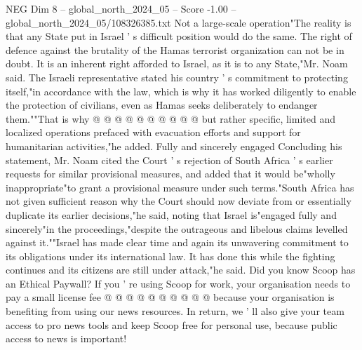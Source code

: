 \begin{textsample}{NEG Dim 8 – global\_north\_2024\_05 – Score -1.00 – global\_north\_2024\_05/108326385.txt}
Not a large-scale operation"The reality is that any State put in Israel ' s difficult position would do the same.
The right of defence against the brutality of the Hamas terrorist organization can not be in doubt.
It is an inherent right afforded to Israel, as it is to any State,"Mr.
Noam said.
The Israeli representative stated his country ' s commitment to protecting itself,"in accordance with the law, which is why it has worked diligently to enable the protection of civilians, even as Hamas seeks deliberately to endanger them.""That is why @ @ @ @ @ @ @ @ @ @ but rather specific, limited and localized operations prefaced with evacuation efforts and support for humanitarian activities,"he added.
Fully and sincerely engaged Concluding his statement, Mr.
Noam cited the Court ' s rejection of South Africa ' s earlier requests for similar provisional measures, and added that it would be"wholly inappropriate"to grant a provisional measure under such terms."South Africa has not given sufficient reason why the Court should now deviate from or essentially duplicate its earlier decisions,"he said, noting that Israel is"engaged fully and sincerely"in the proceedings,"despite the outrageous and libelous claims levelled against it.""Israel has made clear time and again its unwavering commitment to its obligations under its international law.
It has done this while the fighting continues and its citizens are still under attack,"he said.
Did you know Scoop has an Ethical Paywall?
If you ' re using Scoop for work, your organisation needs to pay a small license fee @ @ @ @ @ @ @ @ @ @ because your organisation is benefiting from using our news resources.
In return, we ' ll also give your team access to pro news tools and keep Scoop free for personal use, because public access to news is important!

\end{textsample}
